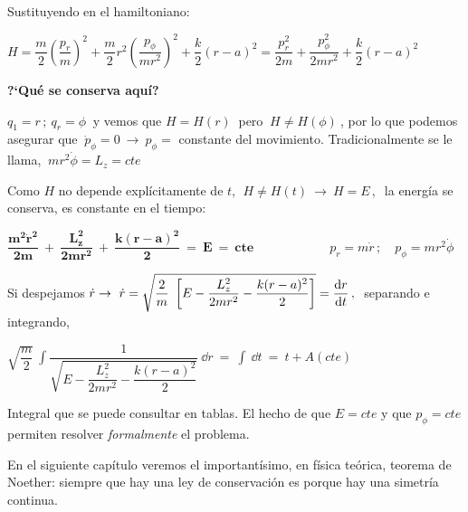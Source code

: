 Sustituyendo en el hamiltoniano:

$H=\dfrac m 2 \left( \dfrac{p_r}{m} \right)^2 + \dfrac m 2 r^2 \left( \dfrac{p_\phi}{mr^2} \right)^2+\dfrac k 2 (r-a)^2 = \dfrac{p_r^2}{2m} + \dfrac{p_\phi^2}{2mr^2} + \dfrac k 2 (r-a)^2$

\vspace{5mm} \textbf{?`Qué se conserva aquí?}

$q_1=r\, ; \ q_r=\phi \ $ y vemos que $  H=H(r)	 \ $ pero $\ H \neq H(\phi) \ $, por lo que podemos asegurar que $ \ \dot p_\phi=0 \ \to \ p_\phi=$ constante del movimiento. Tradicionalmente se le llama, $\ mr^2 \dot \phi=L_z=cte$

Como $H$ no depende explícitamente de $t,\ \ H\neq H(t)\  \to \ H=E\, , \ $ la energía se conserva, es constante en el tiempo:

$\boldsymbol{ \displaystyle
\dfrac{m^2 \dot r^2}{2m} \ + \ \dfrac{L_z^2}{2mr^2} \ + \ \dfrac{k(r-a)^2}{2} \ = \ E \ = \ cte
}
\qquad \qquad \qquad 
p_r=m\dot r\, ; \quad p_\phi=mr^2 \dot \phi$

\vspace{5mm} Si despejamos $\dot r  \to \ \dot r=\sqrt{
\dfrac 2 m \ \left[
E-\dfrac{L_z^2}{2mr^2}-\dfrac{k(r-a)^2}{2}
\right]}
\displaystyle = \dv{r}{t}\, , \  $ separando e integrando,


$\sqrt{\dfrac m 2 } \ \displaystyle \int \dfrac{1}{\sqrt{E-\dfrac{L_z^2}{2mr^2}-\dfrac{k(r-a)^2}{2}}} \ \dd r \ = \ \int \ \dd t \ = \ t + A(cte)$  
 
Integral que se puede consultar en tablas. El hecho de que $E=cte$ y que $p_\phi=cte$ permiten resolver \emph{formalmente} el problema.


En el siguiente capítulo veremos el importantísimo, en física teórica, teorema de Noether: siempre que hay una ley de conservación es porque hay una simetría continua.



